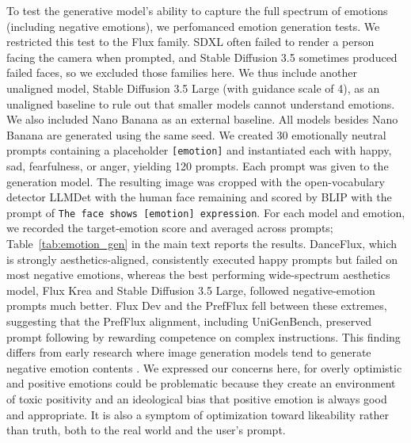 \begin{table}[]
 \centering
 \caption{Emotion generation scores for each model. The scores show how well the model generates the specific emotion, measured by BLIP.}
 \label{tab:emotion_gen}
 \vskip -0.2pt
\end{table}

To test the generative model's ability to capture the full spectrum of emotions (including negative emotions), we perfomanced emotion generation tests. We restricted this test to the Flux family. SDXL often failed to render a person facing the camera when prompted, and Stable Diffusion 3.5 sometimes produced failed faces, so we excluded those families here. We thus include another unaligned model, Stable Diffusion 3.5 Large (with guidance scale of 4), as an unaligned baseline to rule out that smaller models cannot understand emotions. We also included Nano Banana as an external baseline. All models besides Nano Banana are generated using the same seed. We created 30 emotionally neutral prompts containing a placeholder \texttt{[emotion]} and instantiated each with happy, sad, fearfulness, or anger, yielding 120 prompts. Each prompt was given to the generation model. The resulting image was cropped with the open-vocabulary detector LLMDet \cite{fu_llmdet_2025} with the human face remaining and scored by BLIP with the prompt of \texttt{The face shows [emotion] expression}. For each model and emotion, we recorded the target-emotion score and averaged across prompts; Table~\ref{tab:emotion_gen} in the main text reports the results. DanceFlux, which is strongly aesthetics-aligned, consistently executed happy prompts but failed on most negative emotions, whereas the best performing wide-spectrum aesthetics model, Flux Krea and Stable Diffusion 3.5 Large, followed negative-emotion prompts much better. Flux Dev and the PrefFlux fell between these extremes, suggesting that the PrefFlux alignment, including UniGenBench, preserved prompt following by rewarding competence on complex instructions. This finding differs from early research where image generation models tend to generate negative emotion contents \cite{mehta_emotional_2024}. We expressed our concerns here, for overly optimistic and positive emotions could be problematic because they create an environment of toxic positivity and an ideological bias that positive emotion is always good and appropriate. It is also a symptom of optimization toward likeability rather than truth, both to the real world and the user's prompt.



